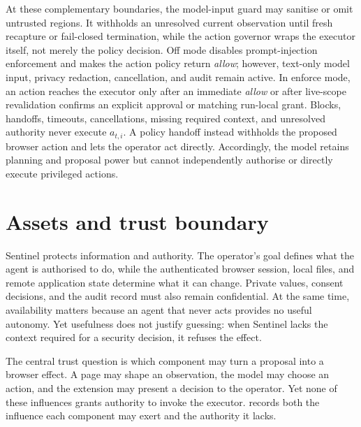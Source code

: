 At these complementary boundaries, the model-input guard may sanitise or omit
untrusted regions. It withholds an unresolved current observation until fresh
recapture or fail-closed termination, while the action governor wraps the
executor itself, not merely the policy decision. Off mode disables prompt-injection
enforcement and makes the action policy return \emph{allow}; however, text-only
model input, privacy redaction, cancellation, and audit remain active. In
enforce mode, an action reaches the executor only after an immediate
\emph{allow} or after live-scope revalidation confirms an explicit approval or
matching run-local grant. Blocks, handoffs, timeouts, cancellations, missing
required context, and unresolved authority never execute $a_{t,i}$. A policy
handoff instead withholds the proposed browser action and lets the operator act
directly. Accordingly, the model retains planning and proposal power but cannot
independently authorise or directly execute privileged actions.

\section{Assets and trust boundary}

Sentinel protects information and authority. The operator's goal defines
what the agent is authorised to do, while the authenticated browser session,
local files, and remote application state determine what it can change. Private
values, consent decisions, and the audit record must also
remain confidential. At the same time, availability matters because an agent
that never acts provides no useful autonomy. Yet usefulness does not justify
guessing: when Sentinel lacks the context required for a security decision, it
refuses the effect.

The central trust question is which component may turn a proposal into a
browser effect. A page may shape an observation, the model may choose an
action, and the extension may present a decision to the operator. Yet none of
these influences grants authority to invoke the executor.
 records both the influence each component may exert
and the authority it lacks.

